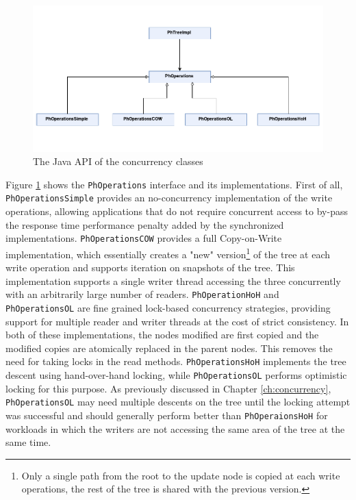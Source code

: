 \documentclass[11pt,a4paper]{globis-book}
\begin{document}
\begin{figure}[h]
    \centering 
    \includegraphics[scale=1]{images/PH-tree-concurrency}
    \caption{The Java API of the concurrency classes}
    \label{fig:Concurrency-classes}
\end{figure}

Figure \ref{fig:Concurrency-classes} shows the \texttt{PhOperations} interface and its implementations. First of all, \texttt{PhOperationsSimple} provides an no-concurrency implementation of the write operations, allowing applications that do not require concurrent access to by-pass the response time performance penalty added by the synchronized implementations. \texttt{PhOperationsCOW} provides a full Copy-on-Write implementation, which essentially creates a "new" version\footnote{Only a single path from the root to the update node is copied at each write operations, the rest of the tree is shared with the previous version.} of the tree at each write operation and supports iteration on snapshots of the tree. This implementation supports a single writer thread accessing the three concurrently with an arbitrarily large number of readers. \texttt{PhOperationHoH} and \texttt{PhOperationsOL} are fine grained lock-based concurrency strategies, providing support for multiple reader and writer threads at the cost of strict consistency. In both of these implementations, the nodes modified are first copied and the modified copies are atomically replaced in the parent nodes. This removes the need for taking locks in the read methods. \texttt{PhOperationsHoH} implements the tree descent using hand-over-hand locking, while \texttt{PhOperationsOL} performs optimistic locking for this purpose. As previously discussed in Chapter \ref{ch:concurrency}, \texttt{PhOperationsOL} may need multiple descents on the tree until the locking attempt was successful and should generally perform better than \texttt{PhOperaionsHoH} for workloads in which the writers are not accessing the same area of the tree at the same time.
\end{document}
